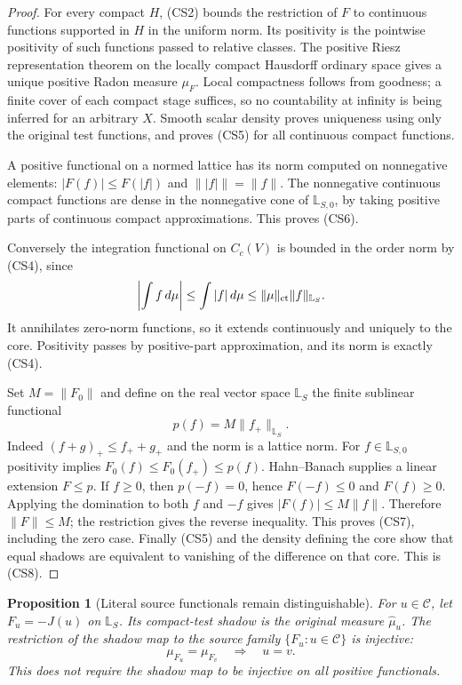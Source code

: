 \documentclass[11pt,a4paper]{article}
\numberwithin{equation}{section}
\newtheorem{proposition}[theorem]{Proposition}
\theoremstyle{definition}
\theoremstyle{remark}
\begin{document}
\begin{proof}
For every compact $H$, (CS2) bounds the restriction of $F$ to
continuous functions supported in $H$ in the uniform norm.
Its positivity is the pointwise positivity of such functions
passed to relative classes. The positive Riesz representation
theorem on the locally compact Hausdorff ordinary space gives
a unique positive Radon measure $\mu_F$. Local compactness
follows from goodness; a finite cover of each compact stage
suffices, so no countability at infinity is being inferred for
an arbitrary $X$. Smooth scalar density proves uniqueness using
only the original test functions, and proves (CS5) for all
continuous compact functions.

A positive functional on a normed lattice has its norm computed
on nonnegative elements: $|F(f)|\leq F(|f|)$ and
$\||f|\|=\|f\|$. The nonnegative continuous compact functions
are dense in the nonnegative cone of $\mathbb L_{S,0}$, by
taking positive parts of continuous compact approximations.
This proves (CS6).

Conversely the integration functional on $C_c(V)$ is bounded
in the order norm by (CS4), since
\[
                 \left|\int f\,d\mu\right|
                      \leq\int |f|\,d\mu
                      \leq\|\mu\|_{\rm ct}\|f\|_{\mathbb L_S}.
\]
It annihilates zero-norm functions, so it extends continuously
and uniquely to the core. Positivity passes by positive-part
approximation, and its norm is exactly (CS4).

Set $M=\|F_0\|$ and define on the real vector space
$\mathbb L_S$ the finite sublinear functional
\[
                            p(f)=M\|f_+\|_{\mathbb L_S}.
 \tag{CS9}
\]
Indeed $(f+g)_+\leq f_++g_+$ and the norm is a lattice norm.
For $f\in\mathbb L_{S,0}$ positivity implies
$F_0(f)\leq F_0(f_+)\leq p(f)$. Hahn--Banach supplies a linear
extension $F\leq p$. If $f\geq0$, then $p(-f)=0$, hence
$F(-f)\leq0$ and $F(f)\geq0$. Applying the domination to both
$f$ and $-f$ gives $|F(f)|\leq M\|f\|$. Therefore
$\|F\|\leq M$; the restriction gives the reverse inequality.
This proves (CS7), including the zero case. Finally (CS5) and
the density defining the core show that equal shadows are
equivalent to vanishing of the difference on that core. This
is (CS8).
\end{proof}

\begin{proposition}[Literal source functionals remain distinguishable]
\label{prop:r12-source-shadow-injectivity}
For $u\in\mathscr C$, let $F_u=-J(u)$ on $\mathbb L_S$.
Its compact-test shadow is the original measure
$\widehat\mu_u$. The restriction of the shadow map to the
source family $\{F_u:u\in\mathscr C\}$ is injective:
\[
                    \mu_{F_u}=\mu_{F_v}\quad\Longrightarrow\quad u=v.
 \tag{CS10}
\]
This does not require the shadow map to be injective on all
positive functionals.
\end{proposition}
\end{document}
